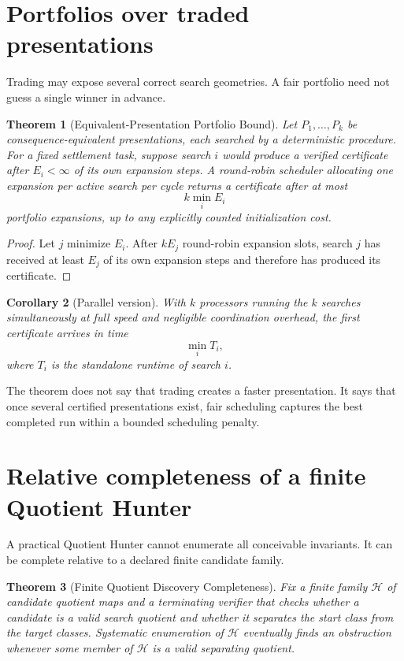 \documentclass[11pt]{article}
\newtheorem{theorem}{Theorem}[section]
\newtheorem{corollary}[theorem]{Corollary}
\theoremstyle{definition}
\theoremstyle{remark}
\begin{document}
\section{Portfolios over traded presentations}
Trading may expose several correct search geometries. A fair portfolio need not guess a single winner in advance.

\begin{theorem}[Equivalent-Presentation Portfolio Bound]
Let $P_1,\ldots,P_k$ be consequence-equivalent presentations, each searched by a deterministic procedure. For a fixed settlement task, suppose search $i$ would produce a verified certificate after $E_i<\infty$ of its own expansion steps. A round-robin scheduler allocating one expansion per active search per cycle returns a certificate after at most
\[
k\min_i E_i
\]
portfolio expansions, up to any explicitly counted initialization cost.
\end{theorem}

\begin{proof}
Let $j$ minimize $E_i$. After $kE_j$ round-robin expansion slots, search $j$ has received at least $E_j$ of its own expansion steps and therefore has produced its certificate.
\end{proof}

\begin{corollary}[Parallel version]
With $k$ processors running the $k$ searches simultaneously at full speed and negligible coordination overhead, the first certificate arrives in time
\[
\min_i T_i,
\]
where $T_i$ is the standalone runtime of search $i$.
\end{corollary}

The theorem does not say that trading creates a faster presentation. It says that once several certified presentations exist, fair scheduling captures the best completed run within a bounded scheduling penalty.

\section{Relative completeness of a finite Quotient Hunter}
A practical Quotient Hunter cannot enumerate all conceivable invariants. It can be complete relative to a declared finite candidate family.

\begin{theorem}[Finite Quotient Discovery Completeness]
Fix a finite family $\mathcal H$ of candidate quotient maps and a terminating verifier that checks whether a candidate is a valid search quotient and whether it separates the start class from the target classes. Systematic enumeration of $\mathcal H$ eventually finds an obstruction whenever some member of $\mathcal H$ is a valid separating quotient.
\end{theorem}
\end{document}
